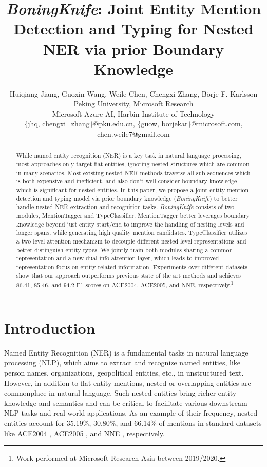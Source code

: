 \documentclass[11pt,a4paper]{article}
\title{\textit{BoningKnife}: Joint Entity Mention Detection and Typing for Nested NER via prior Boundary Knowledge}
\author{
Huiqiang Jiang\textsuperscript{},
Guoxin Wang\textsuperscript{},
Weile Chen\textsuperscript{},
Chengxi Zhang\textsuperscript{},
B{\"o}rje F. Karlsson\textsuperscript{}\\

\textsuperscript{}Peking University,
\textsuperscript{}Microsoft Research\\
\textsuperscript{}Microsoft Azure AI, \textsuperscript{}Harbin Institute of Technology\\
\{jhq, chengxi\_zhang\}@pku.edu.cn, \{guow, borjekar\}@microsoft.com, chen.weile7@gmail.com\\
}
\date{}
\begin{document}
\maketitle
\begin{abstract}
    While named entity recognition (NER) is a key task in natural language processing, most approaches only target flat entities, ignoring nested structures which are common in many scenarios.
Most existing nested NER methods traverse all sub-sequences which is both expensive and inefficient, and also don't well consider boundary knowledge which is significant for nested entities.
In this paper, we propose a joint entity mention detection and typing model via prior boundary knowledge (\textit{BoningKnife}) to better handle nested NER extraction and recognition tasks.
\textit{BoningKnife} consists of two modules, MentionTagger and TypeClassifier.
MentionTagger better leverages boundary knowledge beyond just entity start/end to improve the handling of nesting levels and longer spans, while generating high quality mention candidates. TypeClassifier utilizes a two-level attention mechanism to decouple different nested level representations and better distinguish entity types. We jointly train both modules sharing a common representation and a new dual-info attention layer, which leads to improved representation focus on entity-related information.
Experiments over different datasets show that our approach outperforms previous state of the art methods and achieves 86.41, 85.46, and 94.2 F1 scores on ACE2004, ACE2005, and NNE, respectively.\footnote{Work performed at Microsoft Research Asia between 2019/2020.}








 \end{abstract}
\section{Introduction}
\label{sec:Introduction}
Named Entity Recognition (NER) is a fundamental tasks in natural language processing (NLP), which aims to extract and recognize named entities, like person names, organizations, geopolitical entities, etc., in unstructured text.
However, in addition to flat entity mentions, nested or overlapping entities are commonplace in natural language.
Such nested entities bring richer entity knowledge and semantics and can be critical to facilitate various downstream NLP tasks and real-world applications.
As an example of their frequency, nested entities account for 35.19\%, 30.80\%, and 66.14\% of mentions in standard datasets like ACE2004 \cite{doddington2004automatic}, ACE2005 \cite{walker2006ace}, and NNE \cite{dblp2019nne}, respectively.
\end{document}
